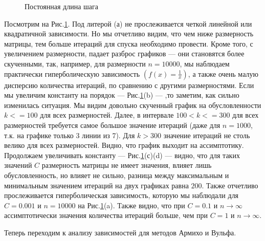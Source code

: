 \documentclass{article}
\begin{document}
\begin{figure}[H]
		\hfill %
		\caption{Постоянная длина шага}
		\label{fig:const_alpha}
	\end{figure}

	Посмотрим на Рис.\ref{fig:const_alpha}. Под литерой (а) не прослеживается четкой линейной или квадратичной зависимости. Но мы отчетливо видим, что чем ниже размерность матрицы, тем больше итераций для спуска необходимо провести. Кроме того, с увеличением размерности, падает разброс графиков --- они становятся более скученными, так, например, для размерности $n = 10000$, мы наблюдаем практически гиперболическую зависимость $(f(x) = \frac{1}{x})$, а также очень малую дисперсию количества итераций, по сравнению с другими размерностями. Если мы увеличим константу на порядок --- Рис.\ref{fig:const_alpha}(b) --- ,то заметим, как сильно изменилась ситуация. Мы видим довольно скученный график на обусловленности $k <= 100$ для всех размерностей. Далее, в интервале $100 < k <= 300$ для всех размерностей требуется самое большое значение итераций (даже для $n = 1000$, т.к. на графике только 3 линии из 7). Для $k>300$ значение итераций не столь велико для всех размерностей. Видно, что график выходит на ассимптотику. Продолжаем увеличивать константу --- Рис.\ref{fig:const_alpha}(с)(d) --- видно, что для таких значений $C$ размерность матрицы не имеет значения, влияет лишь обусловленность, но влияет не сильно, разница между максимальным и минимальным значением итераций на двух графиках равна $200$. Также отчетливо прослеживается гиперболическая зависимость, которую мы наблюдали для $C = 0.001$ и $n = 10000$ на Рис.\ref{fig:const_alpha}(a). Также видно, что при $C = 0.1$ и $n \rightarrow \infty$ ассимптотически значения количества итераций больше, чем при $C = 1$ и $n \rightarrow \infty$.
	
	\vspace{1cm}
	Теперь переходим к анализу зависимостей для методов Армихо и Вульфа. 
	
\end{document}
